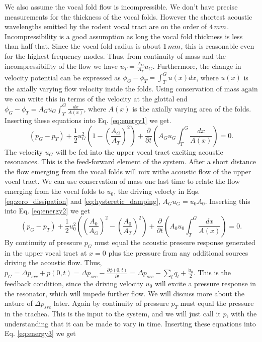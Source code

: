 \documentclass[superscriptaddress, onecolumn, prl]{revtex4}
\begin{document}
We also assume the vocal fold flow is incompressible. We don't have precise measurements for the thickness of the vocal folds. However the shortest acoustic wavelengths emitted by the rodent vocal tract are on the order of $4 \thinspace mm$. Incompressibility is a good assumption as long the vocal fold thickness is less than half that. Since the vocal fold radius is about $1 \thinspace mm$, this is reasonable even for the highest frequency modes. Thus, from continuity of mass and the incompressibility of the flow we have $u_{T}=\frac{A_{G}}{A_{T}}u_{G}$. Furthermore, the change in velocity potential can be expressed as $\phi_{G} - \phi_{T} = \int_{T}^{G} u(x) dx$, where $u(x)$ is the axially varying flow velocity inside the folds. Using conservation of mass again we can write this in terms of the velocity at the glottal end $\phi_{G} - \phi_{T} = A_{G} u_{G} \int_{T}^{G} \frac{dx}{A(x)}$, where $A(x)$ is the axially varying area of the folds. Inserting these equations into Eq. \ref{eq:energy1} we get.
\begin{equation}
\label{eq:energy2}
(p_{G} - p_{T}) + \frac{1}{2} u_{G}^2 \left(1 - \left( \frac{A_{G}}{A_{T}} \right)^2 \right) + \frac{\partial}{\partial t} \left( A_{G} u_{G} \int_{T}^{G} \frac{dx}{A(x)} \right) = 0.
\end{equation} 
The velocity $u_{G}$ will be fed into the upper vocal tract exciting acoustic resonances. This is the feed-forward element of the system. After a short distance the flow emerging from the vocal folds will mix withe acoustic flow of the upper vocal tract. We can use conservation of mass one last time to relate the flow emerging from the vocal folds to $u_0$, the driving velocty in Eqs. \ref{eq:zero_dissipation} and \ref{eq:hysteretic_damping}, $A_{G} u_{G} = u_0 A_0$. Inserting this into Eq. \ref{eq:energy2} we get 
\begin{equation}
\label{eq:energy3}
(p_{G} - p_{T}) + \frac{1}{2} u_{0}^2 \left( \left( \frac{A_{0}}{A_{G}} \right)^2- \left( \frac{A_{0}}{A_{T}} \right)^2 \right) + \frac{\partial}{\partial t} \left( A_{0} u_{0} \int_{T}^{G} \frac{dx}{A(x)} \right) = 0.
\end{equation} 
By continuity of pressure $p_{G}$ must equal the acoustic pressure response generated in the upper vocal tract at $x=0$ plus the pressure from any additional sources driving the acoustic flow. Thus, $p_{G}=\Delta p_{src} + p(0,t)= \Delta p_{src} -\frac{\partial \phi(0,t)}{\partial t}= \Delta p_{src} -\sum_l{\dot{q}_l} + \frac{\dot{u}_0}{2}$. This is the feedback condition, since the driving velocity $u_0$ will excite a pressure response in the resonator, which will impede further flow. We will discuss more about the nature of $\Delta p_{src}$ later. Again by continuity of pressure $p_{T}$ must equal the pressure in the trachea. This is the input to the system, and we will just call it $p$, with the understanding that it can be made to vary in time. Inserting these equations into Eq. \ref{eq:energy3} we get 
\end{document}
